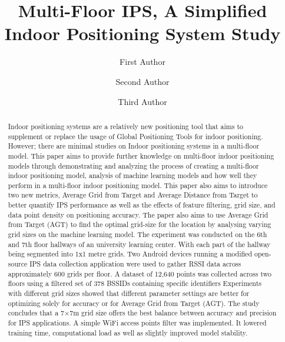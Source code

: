 \documentclass[runningheads]{llncs}
\begin{document}
%
\title{Multi-Floor IPS, A Simplified Indoor Positioning System Study}
%
%
\author{First Author \and
Second Author \and
Third Author}
%
%
%
\maketitle              %
%
\begin{abstract}
Indoor positioning systems are a relatively new positioning tool that aims to supplement or replace the usage of Global Positioning Tools for indoor positioning. However; there are minimal studies on Indoor positioning systems in a multi-floor model. This paper aims to provide further knowledge on multi-floor indoor positioning models through demonstrating and analyzing the process of creating a multi-floor indoor positioning model, analysis of machine learning models and how well they perform in a multi-floor indoor positioning model. This paper also aims to introduce two new metrics, Average Grid from Target and Average Distance from Target to better quantify IPS performance as well as the effects of feature filtering, grid size, and data point density on positioning accuracy. The paper also aims to use Average Grid from Target (AGT) to find the optimal grid-size for the location by analysing varying grid sizes on the machine learning model. The experiment was conducted on the 6th and 7th floor hallways of an university learning center. With each part of the hallway being segmented into 1x1 metre grids. Two Android devices running a modified open-source IPS data collection application were used to gather RSSI data across approximately 600 grids per floor. A dataset of 12,640 points was collected across two floors using a filtered set of 378 BSSIDs containing specific identifiers Experiments with different grid sizes showed that different parameter settings are better for optimizing solely for accuracy or for Average Grid from Target (AGT). The study concludes that a 7×7m grid size offers the best balance between accuracy and precision for IPS applications. A simple WiFi access points filter was implemented. It lowered training time, computational load as well as slightly improved model stability. 

\end{abstract}
%
%
%
\newpage
\end{document}
